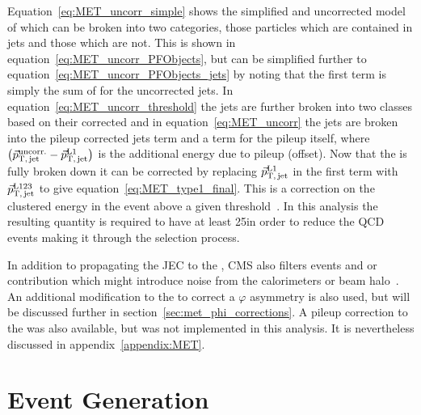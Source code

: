 Equation~\ref{eq:MET_uncorr_simple} shows the simplified and uncorrected model of \VETslash which can be broken into two categories, those particles which are contained in jets and those which are not.
This is shown in equation~\ref{eq:MET_uncorr_PFObjects}, but can be simplified further to equation~\ref{eq:MET_uncorr_PFObjects_jets} by noting that the first term is simply the sum of \pt for the uncorrected jets.
In equation~\ref{eq:MET_uncorr_threshold} the jets are further broken into two classes based on their corrected \pt and in equation~\ref{eq:MET_uncorr} the jets are broken into the pileup corrected jets term and a term for the pileup itself, where $\left({\vec p}_{\mathrm{T,\,jet}}^{\mathrm{uncorr.}}-{\vec p}_{\mathrm{T,\,jet}}^{\mathrm{L1}}\right)$ is the additional energy due to pileup (offset).
Now that the \VETslash is fully broken down it can be corrected by replacing ${\vec p}_{\mathrm{T,\,jet}}^{\mathrm{L1}}$ in the first term with ${\vec p}_{\mathrm{T,\,jet}}^{\mathrm{L123}}$ to give equation~\ref{eq:MET_type1_final}.
This is a correction on the clustered energy in the event above a given threshold~\cite{METAnalysis}.
In this analysis the resulting quantity is required to have at least 25\gev in order to reduce the QCD events making it through the selection process.


In addition to propagating the JEC to the \VETslash, CMS also filters events and or \VETslash contribution which might introduce noise from the calorimeters or beam halo~\cite{METperf2011}. An additional modification to the \VETslash to correct a $\varphi$ asymmetry is also used, but will be discussed further in section~\ref{sec:met_phi_corrections}. A pileup correction to the \VETslash was also available, but was not implemented in this analysis. It is nevertheless discussed in appendix~\ref{appendix:MET}.

\section{Event Generation}
\label{sec:event_generation}

